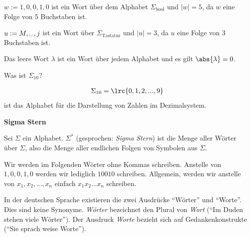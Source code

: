 \begin{myexample}
\begin{aenum}
	\item $w := 1,0,0,1,0$ ist ein Wort über dem Alphabet $\Sigma_{\text{bool}}$ und $|w| = 5$, da $w$ eine Folge von $5$ Buchstaben ist.
	\item $u := M,\text{\textvisiblespace}\,, j$ ist ein Wort über $\Sigma_{\text{Tastatur}}$ und $|u| = 3$, da $u$ eine Folge von $3$ Buchstaben ist.
	\item Das leere Wort $\lambda$ ist ein Wort über jedem Alphabet und es gilt $\abs{\lambda} = 0$.
\end{aenum}
\end{myexample}

\begin{myexercise}
	Was ist $\Sigma_{10}$?
	\begin{myanswer}
		\noindent
		\begin{align*}
			\Sigma_{10} = \lrc{0,1,2,...,9}
		\end{align*}
		ist das Alphabet für die Darstellung von Zahlen im Dezimalsystem.
	\end{myanswer}
\end{myexercise}

\begin{mydefinition}{\textbf{Sigma Stern}}

Sei $\Sigma$ ein Alphabet. $\Sigma^*$ (gesprochen: \textit{Sigma Stern}) ist die Menge aller Wörter über $\Sigma$, also die Menge aller endlichen Folgen von Symbolen aus $\Sigma$.
\end{mydefinition}

\begin{myremark}
	\begin{aenum}
		\item Wir werden im Folgenden Wörter ohne Kommas schreiben. Anstelle von $1,0,0,1,0$ werden wir lediglich $10010$ schreiben. Allgemein, werden wir anstelle von $x_1,x_2,...,x_n$ einfach $x_1x_2...x_n$ schreiben.
		\item In der deutschen Sprache existieren die zwei Ausdrücke \enquote{Wörter} und \enquote{Worte}. Dies sind keine Synonyme. \textit{Wörter} bezeichnet den Plural von \textit{Wort} (\enquote{Im Duden stehen viele Wörter}). Der Ausdruck \textit{Worte} bezieht sich auf Gedankenkonstrukte (\enquote{Sie sprach weise Worte}).
	\end{aenum}
\end{myremark}


